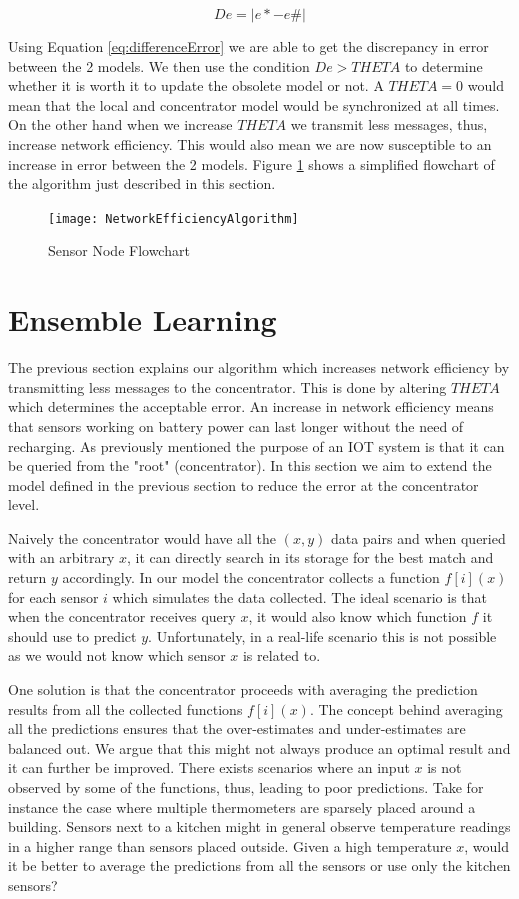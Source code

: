 \documentclass{mproj}
\begin{document}
\begin{equation}
\label{eq:differenceError}
De = |e* - e\#|
\end{equation}

Using Equation \ref{eq:differenceError} we are able to get the discrepancy in error between the 2 models. We then use the condition $De > THETA$ to determine whether it is worth it to update the obsolete model or not. A $THETA=0$ would mean that the local and concentrator model would be synchronized at all times. On the other hand when we increase $THETA$ we transmit less messages, thus, increase network efficiency. This would also mean we are now susceptible to an increase in error between the 2 models. Figure \ref{fig:nea} shows a simplified flowchart of the algorithm just described in this section.


\begin{figure}[H]
\caption{Sensor Node Flowchart}
\label{fig:nea}
\centerline{\texttt{[image: NetworkEfficiencyAlgorithm]}}
\end{figure}

\section{Ensemble Learning}
The previous section explains our algorithm which increases network efficiency by transmitting less messages to the concentrator. This is done by altering $THETA$ which determines the acceptable error. An increase in network efficiency means that sensors working on battery power can last longer without the need of recharging. As previously mentioned the purpose of an IOT system is that it can be queried from the "root" (concentrator). In this section we aim to extend the model defined in the previous section to reduce the error at the concentrator level.

Naively the concentrator would have all the $(x,y)$ data pairs and when queried with an arbitrary $x$, it can directly search in its storage for the best match and return $y$ accordingly. In our model the concentrator collects a function $f[i](x)$ for each sensor $i$ which simulates the data collected. The ideal scenario is that when the concentrator receives query $x$, it would also know which function $f$ it should use to predict $y$. Unfortunately, in a real-life scenario this is not possible as we would not know which sensor $x$ is related to.

One solution is that the concentrator proceeds with averaging the prediction results from all the collected functions $f[i](x)$. The concept behind averaging all the predictions ensures that the over-estimates and under-estimates are balanced out. We argue that this might not always produce an optimal result and it can further be improved. There exists scenarios where an input $x$ is not observed by some of the functions, thus, leading to poor predictions. Take for instance the case where multiple thermometers are sparsely placed around a building. Sensors next to a kitchen might in general observe temperature readings in a higher range than sensors placed outside. Given a high temperature $x$, would it be better to average the predictions from all the sensors or use only the kitchen sensors?
\end{document}

